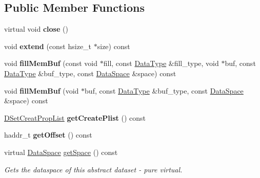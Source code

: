 \subsection*{Public Member Functions}
\begin{DoxyCompactItemize}
\item 
\mbox{\label{class_h5_1_1_data_set_a3c8817b1aaccdc7321613c72450f4c25}} 
virtual void {\bfseries close} ()
\item 
\mbox{\label{class_h5_1_1_data_set_afc129e130931208e583f5365fd1b8adf}} 
void {\bfseries extend} (const hsize\+\_\+t $\ast$size) const
\item 
\mbox{\label{class_h5_1_1_data_set_a5756e19990bd92d8330dd3c0a103e320}} 
void {\bfseries fill\+Mem\+Buf} (const void $\ast$fill, const \hyperlink{class_h5_1_1_data_type}{Data\+Type} \&fill\+\_\+type, void $\ast$buf, const \hyperlink{class_h5_1_1_data_type}{Data\+Type} \&buf\+\_\+type, const \hyperlink{class_h5_1_1_data_space}{Data\+Space} \&space) const
\item 
\mbox{\label{class_h5_1_1_data_set_a2b392d2501798805244b70cccd600616}} 
void {\bfseries fill\+Mem\+Buf} (void $\ast$buf, const \hyperlink{class_h5_1_1_data_type}{Data\+Type} \&buf\+\_\+type, const \hyperlink{class_h5_1_1_data_space}{Data\+Space} \&space) const
\item 
\mbox{\label{class_h5_1_1_data_set_af26b765feecf061bf298fe2466965947}} 
\hyperlink{class_h5_1_1_d_set_creat_prop_list}{D\+Set\+Creat\+Prop\+List} {\bfseries get\+Create\+Plist} () const
\item 
\mbox{\label{class_h5_1_1_data_set_a42306b281362c49c530e4f6f597d25a8}} 
haddr\+\_\+t {\bfseries get\+Offset} () const
\item 
\mbox{\label{class_h5_1_1_data_set_a49745208bc198e9869b48fc678dbde67}} 
virtual \hyperlink{class_h5_1_1_data_space}{Data\+Space} \hyperlink{class_h5_1_1_data_set_a49745208bc198e9869b48fc678dbde67}{get\+Space} () const
\begin{DoxyCompactList}\small\item\em Gets the dataspace of this abstract dataset -\/ pure virtual. \end{DoxyCompactList}\item 

\end{DoxyCompactItemize}
